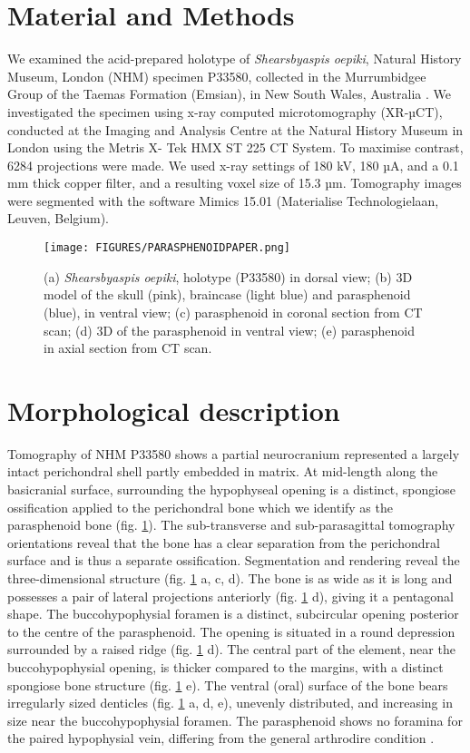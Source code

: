 \documentclass[11pt,letterpaper]{report}
\begin{document}
\section{Material and Methods}
We examined the acid-prepared holotype of \textit{Shearsbyaspis oepiki}, Natural History Museum, London (NHM) specimen P33580, collected in the Murrumbidgee Group of the Taemas Formation (Emsian), in New South Wales, Australia \citep{Young1985}. We investigated the specimen using x-ray computed microtomography (XR-µCT), conducted at the Imaging and Analysis Centre at the Natural History Museum in London using the Metris X- Tek HMX ST 225 CT System. To maximise contrast, 6284 projections were made. We used x-ray settings of 180 kV, 180 µA, and a 0.1 mm thick copper filter, and a resulting voxel size of 15.3 µm. Tomography images were segmented with the software Mimics 15.01 (Materialise Technologielaan, Leuven, Belgium).

\begin{figure}[!h]
\centering
    \texttt{[image: FIGURES/PARASPHENOIDPAPER.png]}
\caption{\footnotesize{(a) \textit{Shearsbyaspis oepiki}, holotype (P33580) in dorsal view; (b) 3D model of the skull (pink), braincase (light blue) and parasphenoid (blue), in ventral view; (c) parasphenoid in coronal section from CT scan; (d) 3D of the parasphenoid in ventral view; (e) parasphenoid in axial section from CT scan.}}
\label{parasphnoidtable}
\end{figure}

\section{Morphological description}
Tomography of NHM P33580 shows a partial neurocranium represented a largely intact perichondral shell partly embedded in matrix. At mid-length along the basicranial surface, surrounding the hypophyseal opening is a distinct, spongiose ossification applied to the perichondral bone which we identify as the parasphenoid bone (fig. \ref{parasphnoidtable}). The sub-transverse and sub-parasagittal tomography orientations reveal that the bone has a clear separation from the perichondral surface and is thus a separate ossification. Segmentation and rendering reveal the three-dimensional structure (fig. \ref{parasphnoidtable} a, c, d). The bone is as wide as it is long and possesses a pair of lateral projections anteriorly (fig. \ref{parasphnoidtable} d), giving it a pentagonal shape. The buccohypophysial foramen is a distinct, subcircular opening posterior to the centre of the parasphenoid. The opening is situated in a round depression surrounded by a raised ridge (fig. \ref{parasphnoidtable} d). The central part of the element, near the buccohypophysial opening, is thicker compared to the margins, with a distinct spongiose bone structure (fig. \ref{parasphnoidtable} e). The ventral (oral) surface of the bone bears irregularly sized denticles (fig. \ref{parasphnoidtable} a, d, e), unevenly distributed, and increasing in size near the buccohypophysial foramen. The parasphenoid shows no foramina for the paired hypophysial vein, differing from the general arthrodire condition \citep{Stensi1963a,Goujet1984a,dupret2010revision}.
\end{document}
